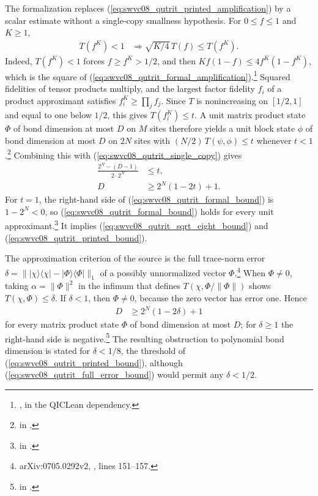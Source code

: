 \documentclass{article}
\begin{document}
The formalization replaces (\ref{eq:swvc08_qutrit_printed_amplification}) by a
scalar estimate without a single-copy smallness hypothesis. For
$0\le f\le1$ and $K\ge1$,
\begin{align}
    T(f^K)<1 & \Longrightarrow\sqrt{K/4}\,T(f)\le T(f^K).
    \label{eq:swvc08_qutrit_formal_amplification}
\end{align}
Indeed, $T(f^K)<1$ forces $f\ge f^K>1/2$, and then
$Kf(1-f)\le4f^K(1-f^K)$, which is the square of
(\ref{eq:swvc08_qutrit_formal_amplification}).\footnote{%
    , in the
    QICLean dependency.}
Squared fidelities of tensor products multiply, and the largest factor
fidelity $f_i$ of a product approximant satisfies $f_i^K\ge\prod_jf_j$.
Since $T$ is nonincreasing on $[1/2,1]$ and equal to one below $1/2$, this
gives $T(f_i^K)\le t$. A unit matrix product state $\Phi$ of bond dimension at
most $D$ on $M$ sites therefore yields a unit block state $\phi$ of bond
dimension at most $D$ on $2N$ sites with $(N/2)\,T(\psi,\phi)\le t$ whenever
$t<1$.\footnote{
    in .}
Combining this with (\ref{eq:swvc08_qutrit_single_copy}) gives
\begin{align}
    \frac{2^N-(D-1)}{2\cdot2^N} & \le t,
    \label{eq:swvc08_qutrit_formal_combination} \\
    D                           & \ge2^N(1-2t)+1.
    \label{eq:swvc08_qutrit_formal_bound}
\end{align}
For $t=1$, the right-hand side of (\ref{eq:swvc08_qutrit_formal_bound}) is
$1-2^N<0$, so (\ref{eq:swvc08_qutrit_formal_bound}) holds for every unit
approximant.\footnote{
    in .}
It implies (\ref{eq:swvc08_qutrit_sqrt_eight_bound}) and
(\ref{eq:swvc08_qutrit_printed_bound}).

The approximation criterion of the source is the full trace-norm error
$\delta=\lVert|\chi\rangle\langle\chi|-|\Phi\rangle\langle\Phi|\rVert_1$ of
a possibly unnormalized vector $\Phi$.\footnote{arXiv:0705.0292v2,
    , lines 151--157.}
When $\Phi\ne0$, taking $\alpha=\lVert\Phi\rVert^2$ in the infimum that
defines $T(\chi,\Phi/\lVert\Phi\rVert)$ shows $T(\chi,\Phi)\le\delta$. If $\delta<1$, then $\Phi\ne0$, because the zero vector has
error one. Hence
\begin{align}
    D & \ge2^N(1-2\delta)+1
    \label{eq:swvc08_qutrit_full_error_bound}
\end{align}
for every matrix product state $\Phi$ of bond dimension at most $D$; for
$\delta\ge1$ the right-hand side is negative.\footnote{%
    in .}
The resulting obstruction to polynomial bond dimension is stated for
$\delta<1/8$, the threshold of (\ref{eq:swvc08_qutrit_printed_bound}), although
(\ref{eq:swvc08_qutrit_full_error_bound}) would permit any $\delta<1/2$.
\end{document}
